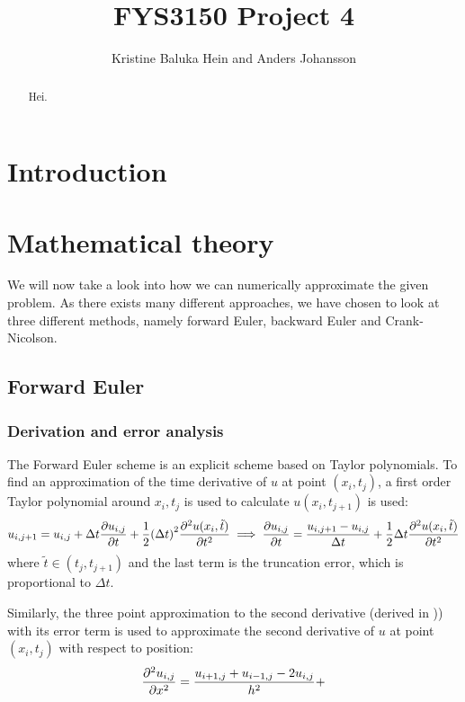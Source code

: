 \documentclass[12pt,english,a4paper]{article}
\title{FYS3150 Project 4}
\author{Kristine Baluka Hein and Anders Johansson}
\begin{document}

\pagestyle{fancy}
\tableofcontents

\begin{abstract}
Hei.
\end{abstract}
\clearpage

\section{Introduction}
\section{Mathematical theory}
We will now take a look into how we can numerically approximate the given problem. As there exists many different approaches, we have chosen to look at three different methods, namely forward Euler, backward Euler and Crank-Nicolson. 

%
\subsection{Forward Euler}

\subsubsection{Derivation and error analysis}\label{sec:ForwardEulerDerivation}
The Forward Euler scheme is an explicit scheme based on Taylor polynomials. To find an approximation of the time derivative of \(u\) at point \((x_i,t_j)\), a first order Taylor polynomial around \(x_i,t_j\) is used to calculate \(u(x_i,t_{j+1})\) is used:
\[
    u_{i,j+1} = u_{i,j} + \Delta t\pdv{u_{i,j}}{t} + \frac{1}{2}\qty(\Delta t)^2\pdv[2]{u(x_i,\tilde{t})}{t}
    \implies \pdv{u_{i,j}}{t} = \frac{u_{i,j+1}-u_{i,j}}{\Delta t} + \frac{1}{2}\Delta t\pdv[2]{u(x_i,\tilde{t})}{t} 
\]
where \(\tilde{t}\in(t_j,t_{j+1})\) and the last term is the truncation error, which is proportional to \(\Delta t\).

Similarly, the three point approximation to the second derivative (derived in \autocite{oblig1})) with its error term is used to approximate the second derivative of \(u\) at point \((x_i,t_j)\) with respect to position:
\[
    \pdv[2]{u_{i,j}}{x} = \frac{u_{i+1,j} + u_{i-1,j} - 2u_{i,j}}{h^2} +
\]
\end{document}
